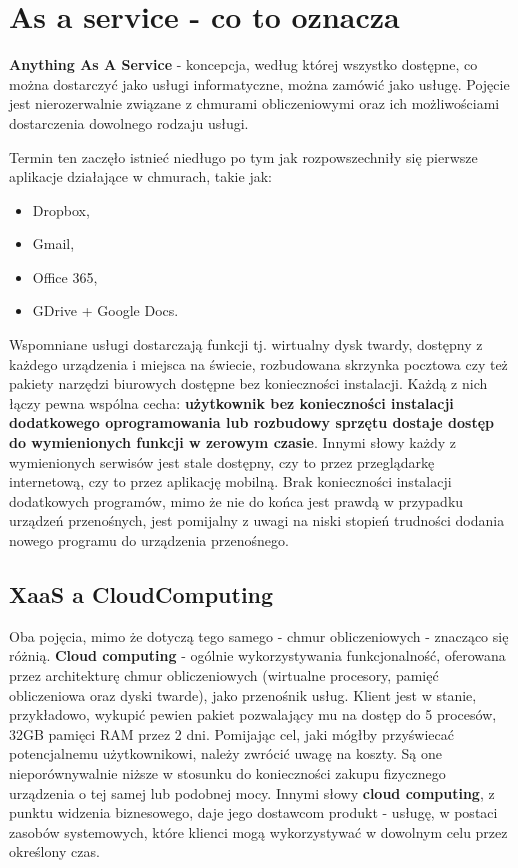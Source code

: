 \section{As a service - co to oznacza}
\label{chapter:monitoring_architecture:xaas}

\textbf{Anything As A Service} - koncepcja, według której wszystko dostępne, co można dostarczyć
jako usługi informatyczne, można zamówić jako usługę.
 Pojęcie jest nierozerwalnie związane z chmurami
obliczeniowymi oraz ich możliwościami dostarczenia dowolnego rodzaju usługi.

Termin ten zaczęło istnieć niedługo po tym jak rozpowszechniły się pierwsze aplikacje działające w chmurach, takie jak:
\begin{itemize}
    \item Dropbox,
    \item Gmail,
    \item Office 365,
    \item GDrive + Google Docs.
   \end{itemize}
Wspomniane usługi dostarczają funkcji tj. wirtualny dysk twardy, dostępny z każdego urządzenia i miejsca na świecie,
rozbudowana skrzynka pocztowa czy też pakiety narzędzi biurowych dostępne bez konieczności instalacji.
Każdą z nich łączy pewna wspólna cecha: \textbf{użytkownik bez konieczności instalacji dodatkowego oprogramowania lub rozbudowy sprzętu dostaje dostęp do wymienionych funkcji w zerowym czasie}. Innymi słowy każdy z wymienionych serwisów
jest stale dostępny, czy to przez przeglądarkę internetową, czy to przez aplikację mobilną. Brak konieczności instalacji dodatkowych programów, mimo że nie do końca jest prawdą w przypadku urządzeń przenośnych, jest pomijalny z uwagi na niski stopień
trudności dodania nowego programu do urządzenia przenośnego. 

\subsection{XaaS a CloudComputing}
Oba pojęcia, mimo że dotyczą tego samego - chmur obliczeniowych - znacząco się różnią. \textbf{Cloud computing} - ogólnie wykorzystywania funkcjonalność,
oferowana przez architekturę chmur obliczeniowych (wirtualne procesory, pamięć obliczeniowa oraz dyski twarde), 
jako przenośnik usług. Klient jest w stanie, przykładowo, wykupić pewien pakiet pozwalający mu na dostęp do 5 procesów, 
32GB pamięci RAM przez 2 dni. Pomijając cel, jaki mógłby przyświecać potencjalnemu użytkownikowi, należy zwrócić uwagę na koszty. 
Są one nieporównywalnie niższe w stosunku do konieczności zakupu fizycznego urządzenia
o tej samej lub podobnej mocy. Innymi słowy \textbf{cloud computing},
z punktu widzenia biznesowego, daje jego dostawcom produkt - usługę, w postaci zasobów 
systemowych, które klienci mogą wykorzystywać w dowolnym celu przez określony czas.

